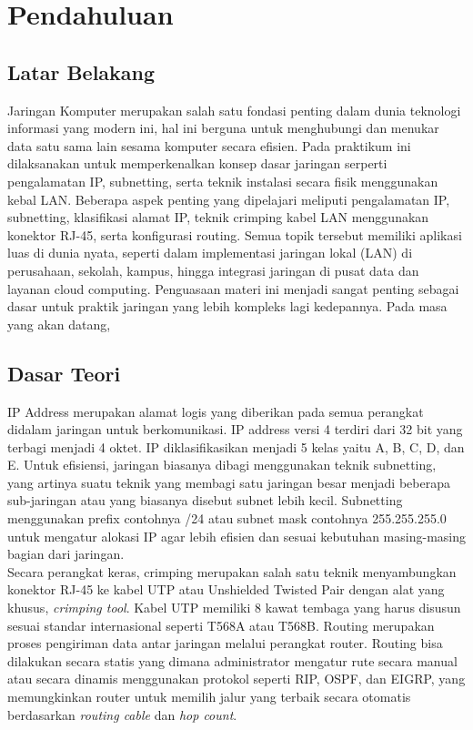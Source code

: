 \section{Pendahuluan}
\subsection{Latar Belakang}
Jaringan Komputer merupakan salah satu fondasi penting dalam dunia teknologi informasi yang modern ini, hal ini berguna untuk menghubungi dan menukar data satu sama lain sesama komputer secara efisien. Pada praktikum ini dilaksanakan untuk memperkenalkan konsep dasar jaringan serperti pengalamatan IP, subnetting, serta teknik instalasi secara fisik menggunakan kebal LAN. Beberapa aspek penting yang dipelajari meliputi pengalamatan IP, subnetting, klasifikasi alamat IP, teknik crimping kabel LAN menggunakan konektor RJ-45, serta konfigurasi routing. Semua topik tersebut memiliki aplikasi luas di dunia nyata, seperti dalam implementasi jaringan lokal (LAN) di perusahaan, sekolah, kampus, hingga integrasi jaringan di pusat data dan layanan cloud computing. Penguasaan materi ini menjadi sangat penting sebagai dasar untuk praktik jaringan yang lebih kompleks lagi kedepannya. Pada masa yang akan datang, 


\subsection{Dasar Teori}
IP Address merupakan alamat logis yang diberikan pada semua perangkat didalam jaringan untuk berkomunikasi. IP address versi 4 terdiri dari 32 bit yang terbagi menjadi 4 oktet. IP diklasifikasikan menjadi 5 kelas yaitu A, B, C, D, dan E. Untuk efisiensi, jaringan biasanya dibagi menggunakan teknik subnetting, yang artinya suatu teknik yang membagi satu jaringan besar menjadi beberapa sub-jaringan atau yang biasanya disebut subnet lebih kecil. Subnetting menggunakan prefix contohnya /24 atau subnet mask contohnya 255.255.255.0 untuk mengatur alokasi IP agar lebih efisien dan sesuai kebutuhan masing-masing bagian dari jaringan.\\
Secara perangkat keras, crimping merupakan salah satu teknik menyambungkan konektor RJ-45 ke kabel UTP atau Unshielded Twisted Pair dengan alat yang khusus, \textit{crimping tool}. Kabel UTP memiliki 8 kawat tembaga yang harus disusun sesuai standar internasional seperti T568A atau T568B. Routing merupakan proses pengiriman data antar jaringan melalui perangkat router. Routing bisa dilakukan secara statis yang dimana administrator mengatur rute secara manual atau secara dinamis menggunakan protokol seperti RIP, OSPF, dan EIGRP, yang memungkinkan router untuk memilih jalur yang terbaik secara otomatis berdasarkan \textit{routing cable} dan \textit{hop count}.

